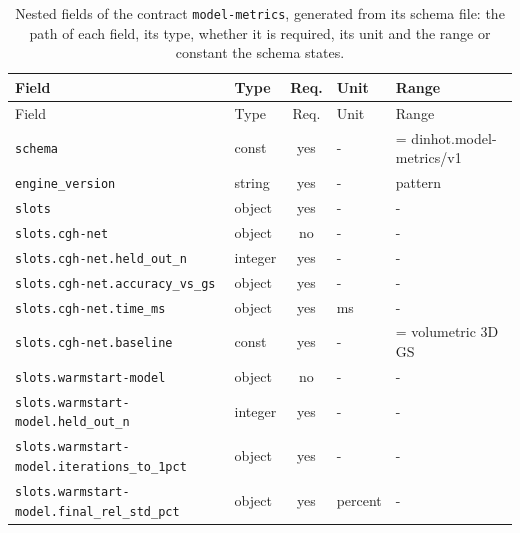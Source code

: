 \begingroup\scriptsize
\begin{longtable}{@{}l l c l l@{}}
\caption{Nested fields of the contract \texttt{model-metrics}, generated from its schema file: the path of each field, its type, whether it is required, its unit and the range or constant the schema states.}\label{tab:fields-model-metrics}\\
\toprule Field & Type & Req. & Unit & Range\\\midrule\endfirsthead
\toprule Field & Type & Req. & Unit & Range\\\midrule\endhead
\texttt{schema} & const & yes & - & = dinhot.model-metrics/v1\\
\texttt{engine\_version} & string & yes & - & pattern\\
\texttt{slots} & object & yes & - & -\\
\texttt{slots.cgh-net} & object & no & - & -\\
\texttt{slots.cgh-net.held\_out\_n} & integer & yes & - & -\\
\texttt{slots.cgh-net.accuracy\_vs\_gs} & object & yes & - & -\\
\texttt{slots.cgh-net.time\_ms} & object & yes & ms & -\\
\texttt{slots.cgh-net.baseline} & const & yes & - & = volumetric 3D GS\\
\texttt{slots.warmstart-model} & object & no & - & -\\
\texttt{slots.warmstart-model.held\_out\_n} & integer & yes & - & -\\
\texttt{slots.warmstart-model.iterations\_to\_1pct} & object & yes & - & -\\
\texttt{slots.warmstart-model.final\_rel\_std\_pct} & object & yes & percent & -\\
\bottomrule\end{longtable}
\endgroup

